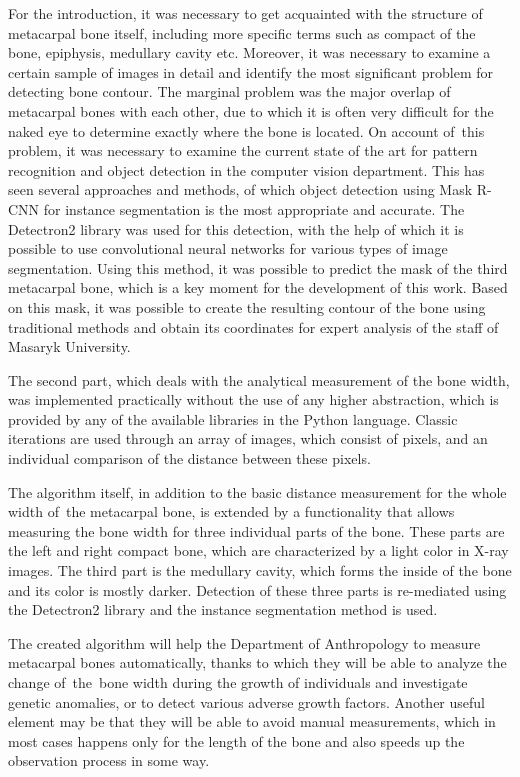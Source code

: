 For the introduction, it was necessary to get acquainted with the structure of metacarpal bone itself, including more specific terms such as compact of the bone, epiphysis, medullary cavity etc. Moreover, it was necessary to examine a certain sample of images in detail and identify the most significant problem for detecting bone contour. The marginal problem was the major overlap of metacarpal bones with each other, due to which it is often very difficult for the naked eye to determine exactly where the bone is located. On account of~this problem, it was necessary to examine the current state of the art for pattern recognition and object detection in the computer vision department. This has seen several approaches and methods, of which object detection using Mask R-CNN for instance segmentation is the most appropriate and accurate. The Detectron2 library was used for this detection, with the help of which it is possible to use convolutional neural networks for various types of image segmentation. Using this method, it was possible to predict the mask of the third metacarpal bone, which is a key moment for the development of this work. Based on this mask, it was possible to create the resulting contour of the bone using traditional methods and obtain its coordinates for expert analysis of the staff of Masaryk University.

The second part, which deals with the analytical measurement of the bone width, was implemented practically without the use of any higher abstraction, which is provided by any of the available libraries in the Python language. Classic iterations are used through an array of images, which consist of pixels, and an individual comparison of the distance between these pixels.

The algorithm itself, in addition to the basic distance measurement for the whole width of~the metacarpal bone, is extended by a functionality that allows measuring the bone width for three individual parts of the bone. These parts are the left and right compact bone, which are characterized by a light color in X-ray images. The third part is the medullary cavity, which forms the inside of the bone and its color is mostly darker. Detection of these three parts is re-mediated using the Detectron2 library and the instance segmentation method is used.

The created algorithm will help the Department of Anthropology to measure metacarpal bones automatically, thanks to which they will be able to analyze the change of~the~bone width during the growth of individuals and investigate genetic anomalies, or to detect various adverse growth factors. Another useful element may be that they will be able to avoid manual measurements, which in most cases happens only for the length of the bone and also speeds up the observation process in some way.

